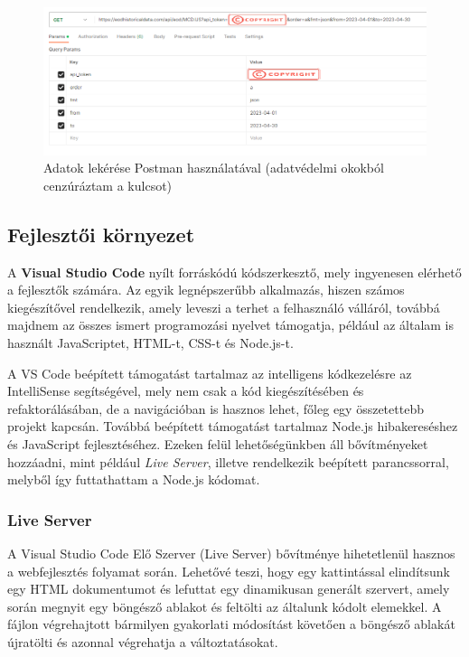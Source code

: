 \begin{figure}[h]
\centering
\includegraphics[scale=0.5]{images/postman.png}
\caption{Adatok lekérése Postman használatával (adatvédelmi okokból cenzúráztam a kulcsot)}
\label{fig:postman}
\end{figure}

\pagebreak

\subsection{Fejlesztői környezet }

A \textbf{Visual Studio Code} nyílt forráskódú kódszerkesztő, mely ingyenesen elérhető a fejlesztők számára. Az egyik legnépszerűbb alkalmazás, hiszen számos kiegészítővel rendelkezik, amely leveszi a terhet a felhasználó válláról, továbbá majdnem az összes ismert programozási nyelvet támogatja, például az általam is használt JavaScriptet, HTML-t, CSS-t és Node.js-t. 

A VS Code beépített támogatást tartalmaz az intelligens kódkezelésre az IntelliSense segítségével, mely nem csak a kód kiegészítésében és refaktorálásában, de a navigációban is hasznos lehet, főleg egy összetettebb projekt kapcsán. Továbbá beépített támogatást tartalmaz Node.js hibakereséshez és JavaScript fejlesztéséhez. Ezeken felül lehetőségünkben áll bővítményeket hozzáadni, mint például \emph{Live Server}, illetve rendelkezik beépített parancssorral, melyből így futtathattam a Node.js kódomat. \cite{vsc}

\subsubsection{Live Server}

A Visual Studio Code Elő Szerver (Live Server) bővítménye hihetetlenül hasznos a webfejlesztés folyamat során. Lehetővé teszi, hogy egy kattintással elindítsunk egy HTML dokumentumot és lefuttat egy dinamikusan generált szervert, amely során megnyit egy böngésző ablakot és feltölti az általunk kódolt elemekkel. A fájlon végrehajtott bármilyen gyakorlati módosítást követően a böngésző ablakát újratölti és azonnal végrehatja a változtatásokat. 

